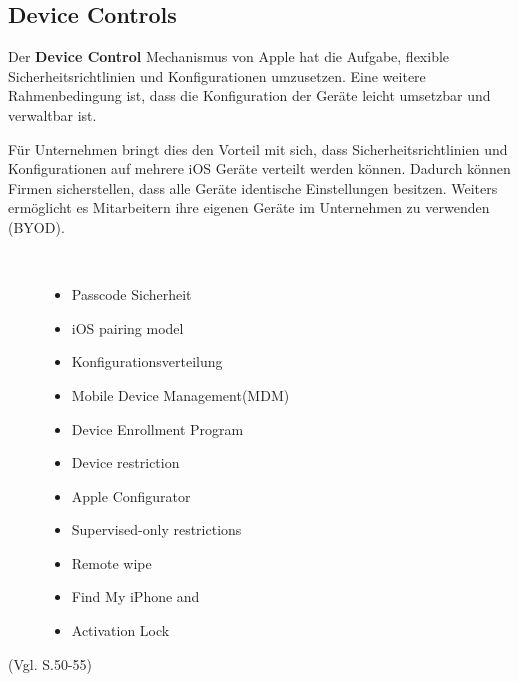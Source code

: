 \subsection{Device Controls}
\label{sec:DeviceControl}
Der \textbf{Device Control} Mechanismus von Apple hat die Aufgabe, flexible Sicherheitsrichtlinien und Konfigurationen umzusetzen. Eine weitere Rahmenbedingung ist, dass die Konfiguration der Geräte leicht umsetzbar und verwaltbar ist.\par 
 Für Unternehmen bringt dies den Vorteil mit sich, dass Sicherheitsrichtlinien und Konfigurationen auf mehrere iOS Geräte verteilt werden können. Dadurch können Firmen sicherstellen, dass alle Geräte identische Einstellungen besitzen. Weiters ermöglicht es Mitarbeitern ihre eigenen Geräte im Unternehmen zu verwenden (BYOD). 
\begin{description}
    \item[\parbox{\textwidth} {Dies sind die Hauptfunktionalitäten des Apple Geräte-Kontrollservice} ]~\par
    \begin{multicols}{2}
    \begin{itemize}
        \item Passcode Sicherheit
        \item iOS pairing model
        \item Konfigurationsverteilung
        \item Mobile Device Management(MDM)
        \item Device Enrollment Program
        \item Device restriction
        \item Apple Configurator
        \item Supervised-only restrictions
        \item Remote wipe
        \item Find My iPhone and 
        \item Activation Lock
    \end{itemize}
    \end{multicols}
\end{description}
(Vgl. \cite{Apple[4]} S.50-55)
